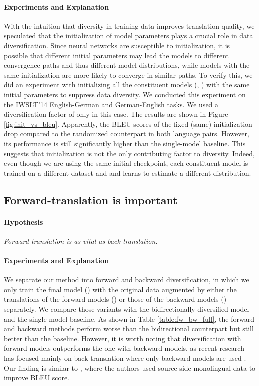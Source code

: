 \documentclass{article}
\begin{document}
\paragraph{Experiments and Explanation} With the intuition that diversity in training data improves translation quality, we speculated that the initialization of model parameters plays a crucial role in data diversification. Since neural networks are susceptible to initialization, it is possible that different initial parameters may lead the models to different convergence paths \citep{goodfellow2016deep} and thus different model distributions, while models with the same initialization are more likely to converge in similar paths. To verify this, we did an experiment with initializing all the constituent models (, ) with the same initial parameters to suppress data  diversity. We conducted this experiment on the IWSLT'14 English-German and German-English tasks. We used a diversification factor of  only in this case. The results are shown in Figure \ref{fig:init_vs_bleu}. Apparently, the BLEU scores of the fixed (same) initialization drop compared to the randomized counterpart in both language pairs. However, its performance is still significantly higher than the single-model baseline. This suggests that initialization is not the only contributing factor to diversity. Indeed, even though we are using the same initial checkpoint, each constituent model is trained on a different dataset and and learns to estimate a different distribution.

\subsection{Forward-translation is important} \label{subsec:fwd}

\paragraph{Hypothesis} \emph{Forward-translation is as vital as back-translation.}

\paragraph{Experiments and Explanation} 
We separate our method into forward and backward diversification, in which we only train the final model () with the original data augmented by either the translations of the forward models () or those of the backward models () separately. We compare those variants with the bidirectionally diversified model and the single-model baseline. 
As shown in Table \ref{table:fw_bw_full}, the forward and backward methods perform worse than the bidirectional counterpart but still better than the baseline. However, it is worth noting that diversification with forward models outperforms the one with backward models, as recent research has focused mainly on back-translation where only backward models are used
\citep{backtranslate_sennrich-etal-2016-improving,understanding_backtranslation_scale}. 
Our finding is similar to \citet{exploit_src_monolingual}, where the authors used source-side monolingual data to improve BLEU score. 
\end{document}
